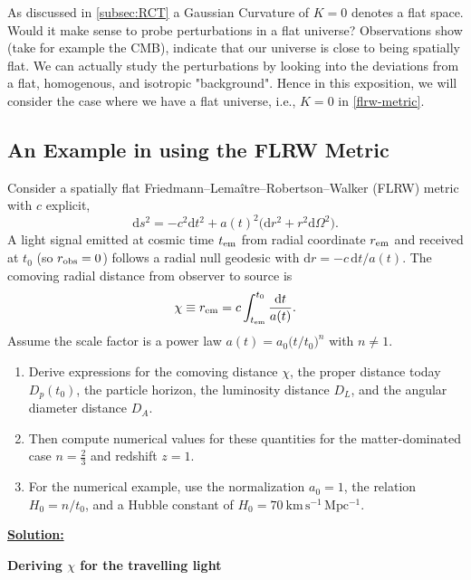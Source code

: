 \documentclass[a4paper,11pt]{article}
\begin{document}
As discussed in \ref{subsec:RCT} a Gaussian Curvature of $K=0$ denotes a flat space. Would it make sense
to probe perturbations in a flat universe? Observations show (take for example the CMB), indicate
that our universe is close to being spatially flat. We can actually study the perturbations by 
looking into the deviations from a flat, homogenous, and isotropic "background". Hence in this exposition,
we will consider the case where we have a flat universe, i.e., $K=0$ in \cref{flrw-metric}.



\subsection{An Example in using the FLRW Metric}

Consider a spatially flat Friedmann–Lemaître–Robertson–Walker (FLRW) metric with $c$ explicit,
$$ \mathrm{d}s^2 = -c^2\mathrm{d}t^2 + a(t)^2\bigl(\mathrm{d}r^2 + r^2\mathrm{d}\Omega^2\bigr). $$
A light signal emitted at cosmic time $t_{\rm em}$ from radial coordinate $r_{\rm em}$ and received at $t_0$ (so $r_{\rm obs}=0$) follows a radial null geodesic with $\mathrm{d}r = -c\,\mathrm{d}t/a(t)$. The comoving radial distance from observer to source is
$$ \chi \equiv r_{\rm em} = c\int_{t_{\rm em}}^{t_0}\frac{\mathrm{d}t}{a(t)}. $$
Assume the scale factor is a power law $a(t)=a_0\bigl(t/t_0\bigr)^n$ with $n\neq 1$.

\vspace{1em} %
\begin{enumerate}
    \item Derive expressions for the comoving distance $\chi$, the proper distance today $D_{p}(t_0)$, the particle horizon, the luminosity distance $D_L$, and the angular diameter distance $D_A$.
    
    \item Then compute numerical values for these quantities for the matter-dominated case $n=\tfrac{2}{3}$ and redshift $z=1$.
    
    \item For the numerical example, use the normalization $a_0=1$, the relation $H_0=n/t_0$, and a Hubble constant of $H_0=70\ \mathrm{km\,s^{-1}\,Mpc^{-1}}$.
\end{enumerate}

\underline{\textbf{Solution:}}

\vspace{1em}

\textbf{Deriving $\chi$ for the travelling light}
\end{document}
